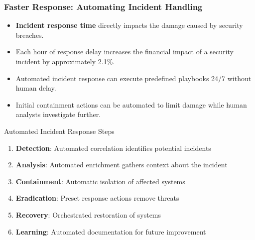 \documentclass{beamer}
\begin{document}
\begin{frame}
  \frametitle{Faster Response: Automating Incident Handling}
  
  \begin{itemize}
    \item \textbf{Incident response time} directly impacts the damage caused by security breaches.
    \item Each hour of response delay increases the financial impact of a security incident by approximately 2.1\%.
    \item Automated incident response can execute predefined playbooks 24/7 without human delay.
    \item Initial containment actions can be automated to limit damage while human analysts investigate further.
  \end{itemize}
  
  \begin{block}{Automated Incident Response Steps}
    \scriptsize
    \begin{enumerate}
      \item \textbf{Detection}: Automated correlation identifies potential incidents
      \item \textbf{Analysis}: Automated enrichment gathers context about the incident
      \item \textbf{Containment}: Automatic isolation of affected systems
      \item \textbf{Eradication}: Preset response actions remove threats
      \item \textbf{Recovery}: Orchestrated restoration of systems
      \item \textbf{Learning}: Automated documentation for future improvement
    \end{enumerate}
  \end{block}
\end{frame}
\end{document}
